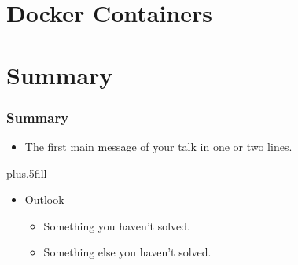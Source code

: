 \documentclass{beamer}
\begin{document}
\section*{Docker Containers}



\section*{Summary}

\begin{frame}
\frametitle<presentation>{Summary}

\begin{itemize}
  \item The \alert{first main message} of your talk in one or two lines.
\end{itemize}

\vskip0pt plus.5fill
\begin{itemize}
  \item Outlook
  \begin{itemize}
    \item Something you haven't solved.
    \item Something else you haven't solved.
  \end{itemize}
\end{itemize}
\end{frame}
\end{document}

